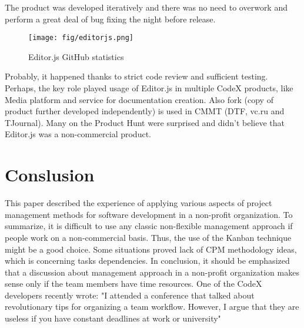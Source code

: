 \documentclass[conference]{IEEEtran}
\begin{document}
    The product was developed iteratively and there was no need to overwork and perform a great deal of bug fixing the night before release.
    \begin{figure}[h!]
        \centering
        \texttt{[image: fig/editorjs.png]}
        \caption{Editor.js GitHub statistics}
        \label{fig:editorjs}
    \end{figure}
    \newline
    Probably, it happened thanks to strict code review and sufficient testing.
    Perhaps, the key role played usage of Editor.js in multiple CodeX products, like Media platform and service for documentation creation.
    Also fork (copy of product further developed independently) is used in CMMT (DTF, vc.ru and TJournal).
    Many on the Product Hunt were surprised and didn't believe that Editor.js was a non-commercial product.

    \section{Conslusion}
    This paper described the experience of applying various aspects of project management methods for software development in a non-profit organization.
    To summarize, it is difficult to use any classic non-flexible management approach if people work on a non-commercial basis.
    Thus, the use of the Kanban technique might be a good choice.
    Some situations proved lack of CPM methodology ideas, which is concerning tasks dependencies.\newline
    In conclusion, it should be emphasized that a discussion about management approach in a non-profit organization makes sense only if the team members have time resources.
    One of the CodeX developers recently wrote: "I attended a conference that talked about revolutionary tips for organizing a team workflow.
    However, I argue that they are useless if you have constant deadlines at work or university"
\end{document}
